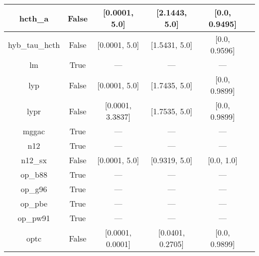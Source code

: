 \begin{tabular}{|c|c|c|c|c|l|}
       hcth\_a &                 False &    [0.0001, 5.0] &    [2.1443, 5.0] &  [0.0, 0.9495] &                                      \cite{Hamprecht1998_6264} \\ \hline
hyb\_tau\_hcth &                 False &    [0.0001, 5.0] &    [1.5431, 5.0] &  [0.0, 0.9596] &                                          \cite{Boese2002_9559} \\ \hline
            lm &                  True &              --- &              --- &            --- &                             \cite{Langreth1981_446,Hu1985_391} \\ \hline
           lyp &                 False &    [0.0001, 5.0] &    [1.7435, 5.0] &  [0.0, 0.9899] &                            \cite{Lee1988_785,Miehlich1989_200} \\ \hline
          lypr &                 False & [0.0001, 3.3837] &    [1.7535, 5.0] &  [0.0, 0.9899] &                                             \cite{Ai2021_1207} \\ \hline
         mggac &                  True &              --- &              --- &            --- &                                        \cite{Patra2019_155140} \\ \hline
           n12 &                  True &              --- &              --- &            --- &                                       \cite{Peverati2012_2310} \\ \hline
       n12\_sx &                 False &    [0.0001, 5.0] &    [0.9319, 5.0] &     [0.0, 1.0] &                                      \cite{Peverati2012_16187} \\ \hline
       op\_b88 &                  True &              --- &              --- &            --- &                                       \cite{Tsuneda1999_10664} \\ \hline
       op\_g96 &                  True &              --- &              --- &            --- &                      \cite{Tsuneda1999_10664,Tsuneda1999_5656} \\ \hline
       op\_pbe &                  True &              --- &              --- &            --- &                      \cite{Tsuneda1999_10664,Tsuneda1999_5656} \\ \hline
      op\_pw91 &                  True &              --- &              --- &            --- &                      \cite{Tsuneda1999_10664,Tsuneda1999_5656} \\ \hline
          optc &                 False & [0.0001, 0.0001] & [0.0401, 0.2705] &  [0.0, 0.9899] &                                           \cite{Cohen2001_607} \\ \hline

\end{tabular}
